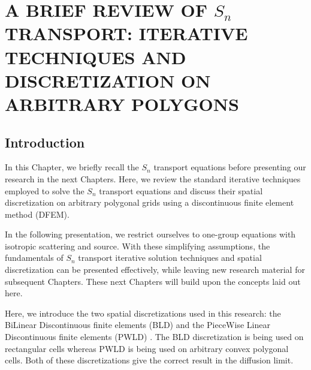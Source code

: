 \chapter{\uppercase{A Brief Review of $S_n$ Transport: Iterative Techniques
and Discretization on Arbitrary Polygons}} \label{spatial_chapter}
\section{Introduction}                      
In this Chapter, we briefly recall the $S_n$ transport equations before presenting 
our research in the next Chapters. Here, we review the standard iterative 
techniques employed to solve the $S_n$ transport equations and discuss their 
spatial discretization on arbitrary polygonal grids using a discontinuous 
finite element method (DFEM).
  
In the following presentation, we restrict ourselves to one-group equations
with isotropic scattering and source. With these simplifying assumptions,
the fundamentals of $S_n$ transport iterative solution techniques and
spatial discretization can be presented effectively, while leaving new
research material for subsequent Chapters. These next Chapters will build
upon the concepts laid out here.

Here, we introduce the two spatial discretizations used
in this research: the BiLinear Discontinuous finite elements (BLD) 
\cite{thick_dgfem,lumping_bld} and the PieceWise Linear Discontinuous finite 
elements (PWLD) \cite{pwld_3d,pwld_2d}. The BLD discretization is being used on
rectangular cells whereas PWLD is being used on arbitrary convex polygonal
cells. Both of these discretizations give the correct result in the diffusion 
limit. 
